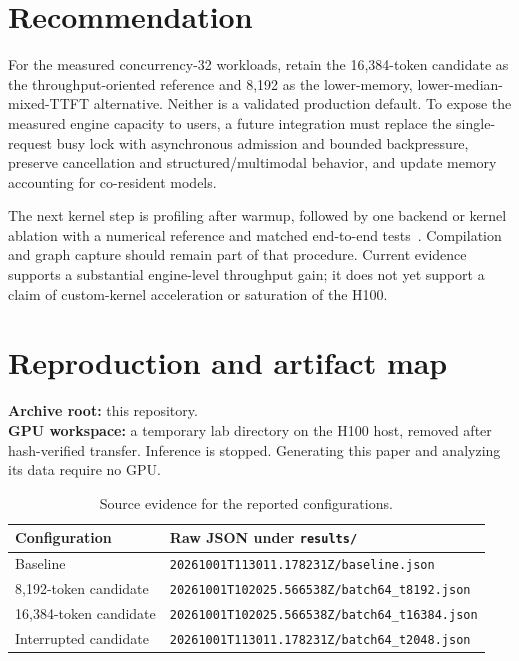 \documentclass[10pt,a4paper]{article}
\newcommand{\code}[1]{\texttt{\small #1}}
\begin{document}
\section{Recommendation}
For the measured concurrency-32 workloads, retain the 16,384-token candidate as
the throughput-oriented reference and 8,192 as the lower-memory, lower-median-
mixed-TTFT alternative. Neither is a validated production default. To expose
the measured engine capacity to users, a future integration must replace the
single-request busy lock with asynchronous admission and bounded backpressure,
preserve cancellation and structured/multimodal behavior, and update memory
accounting for co-resident models.

The next kernel step is profiling after warmup, followed by one backend or kernel
ablation with a numerical reference and matched end-to-end tests~\cite{cuda}.
Compilation and graph capture should remain part of that procedure. Current
evidence supports a substantial engine-level throughput gain; it does not yet
support a claim of custom-kernel acceleration or saturation of the H100.

\newpage
\appendix
\section{Reproduction and artifact map}
\textbf{Archive root:} this repository.\\
\textbf{GPU workspace:} a temporary lab directory on the H100 host, removed
after hash-verified transfer. Inference is stopped. Generating this paper and analyzing its data require no GPU.

\begin{table}[h]
\centering\small
\caption{Source evidence for the reported configurations.}
\begin{tabularx}{\linewidth}{@{}lX@{}}
\toprule
Configuration & Raw JSON under \code{results/} \\
\midrule
Baseline & \nolinkurl{20261001T113011.178231Z/baseline.json} \\
8,192-token candidate & \nolinkurl{20261001T102025.566538Z/batch64_t8192.json} \\
16,384-token candidate & \nolinkurl{20261001T102025.566538Z/batch64_t16384.json} \\
Interrupted candidate & \nolinkurl{20261001T113011.178231Z/batch64_t2048.json} \\
\bottomrule
\end{tabularx}
\end{table}
\end{document}
